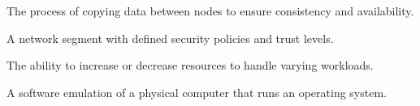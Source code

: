 \documentclass[11pt,letterpaper]{article}
\begin{document}
\begin{description}[style=nextline, leftmargin=3cm, labelwidth=2.8cm]
    \item[Replication] The process of copying data between nodes to ensure consistency and availability.
    
    \item[Security Zone] A network segment with defined security policies and trust levels.
    
    \item[Scaling] The ability to increase or decrease resources to handle varying workloads.
    
    \item[Virtual Machine] A software emulation of a physical computer that runs an operating system.
\end{description}

\end{document}
